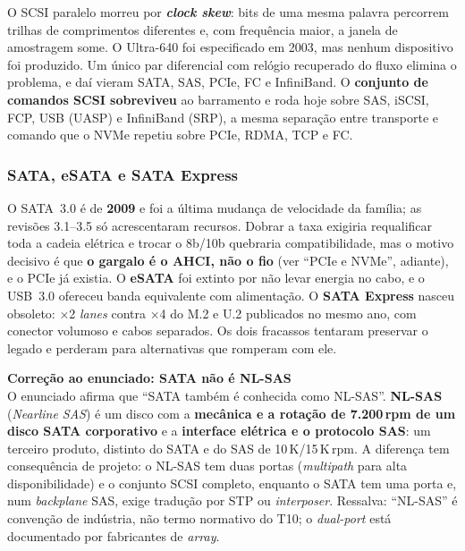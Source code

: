 \documentclass[11pt,a4paper]{article}
\newcommand{\correcao}[2]{%
  \begin{center}\begin{minipage}{0.97\textwidth}
  \colorbox{fundo}{\begin{minipage}{\dimexpr\linewidth-2\fboxsep}
  \vspace{3pt}\textbf{\color{laranja}#1}\\[2pt]\small #2\vspace{3pt}
  \end{minipage}}\end{minipage}\end{center}}
\begin{document}
O SCSI paralelo morreu por \textbf{\emph{clock skew}}: bits de uma mesma palavra percorrem
trilhas de comprimentos diferentes e, com frequência maior, a janela de amostragem some. O
Ultra-640 foi especificado em 2003, mas nenhum dispositivo foi produzido. Um único par
diferencial com relógio recuperado do fluxo elimina o problema, e daí vieram SATA, SAS, PCIe,
FC e InfiniBand. O \textbf{conjunto de comandos SCSI sobreviveu} ao barramento e roda hoje
sobre SAS, iSCSI, FCP, USB (UASP) e InfiniBand (SRP), a mesma separação entre transporte e
comando que o NVMe repetiu sobre PCIe, RDMA, TCP e FC.

\subsubsection*{SATA, eSATA e SATA Express}

O SATA~3.0 é de \textbf{2009} e foi a última mudança de velocidade da família; as revisões
3.1--3.5 só acrescentaram recursos. Dobrar a taxa exigiria requalificar toda a cadeia
elétrica e trocar o 8b/10b quebraria compatibilidade, mas o motivo decisivo é que \textbf{o
gargalo é o AHCI, não o fio} (ver ``PCIe e NVMe'', adiante), e o PCIe já existia. O \textbf{eSATA} foi extinto
por não levar energia no cabo, e o USB~3.0 ofereceu banda equivalente com alimentação. O
\textbf{SATA Express} nasceu obsoleto: $\times$2 \emph{lanes} contra $\times$4 do M.2 e U.2
publicados no mesmo ano, com conector volumoso e cabos separados. Os dois fracassos tentaram
preservar o legado e perderam para alternativas que romperam com ele.

\correcao{Correção ao enunciado: SATA \textbf{não} é NL-SAS}{%
O enunciado afirma que ``SATA também é conhecida como NL-SAS''. \textbf{NL-SAS}
(\emph{Nearline SAS}) é um disco com a \textbf{mecânica e a rotação de 7.200\,rpm de um disco
SATA corporativo} e a \textbf{interface elétrica e o protocolo SAS}: um terceiro produto,
distinto do SATA e do SAS de 10\,K/15\,K\,rpm. A diferença tem consequência de projeto: o
NL-SAS tem duas portas (\emph{multipath} para alta disponibilidade) e o conjunto SCSI
completo, enquanto o SATA tem uma porta e, num \emph{backplane} SAS, exige tradução por STP
ou \emph{interposer}. Ressalva: ``NL-SAS'' é convenção de indústria, não termo normativo do
T10; o \emph{dual-port} está documentado por fabricantes de \emph{array}.}
\end{document}
